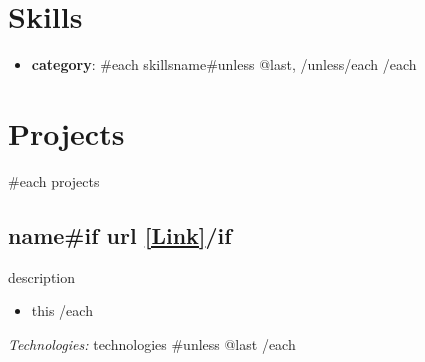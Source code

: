 \documentclass[11pt,letterpaper]{article}
\begin{document}
\section{Skills}
\begin{itemize}[leftmargin=*]
  {{#each skillsByCategory}}
  \item \textbf{{{category}}}: {{#each skills}}{{name}}{{#unless @last}}, {{/unless}}{{/each}}
  {{/each}}
\end{itemize}

\section{Projects}
{{#each projects}}
\subsection{{{name}}{{#if url}} \normalfont\small\textcolor{primary}{\href{{{url}}}{[Link]}}{{/if}}}
{{description}}
\begin{itemize}[leftmargin=*]
  {{#each achievements}}
  \item {{this}}
  {{/each}}
\end{itemize}
\textit{Technologies:} {{technologies}}
{{#unless @last}}
{{/each}}
\end{document}
